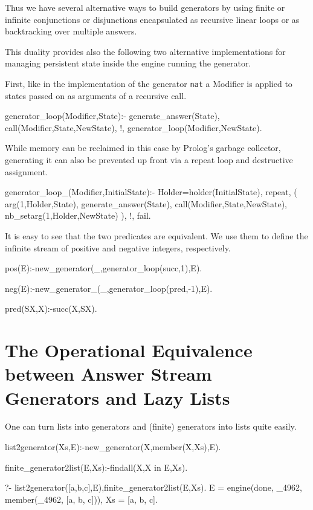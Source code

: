 \documentclass{new_tlp}
\begin{document}
Thus we have several alternative ways to build generators by using finite or infinite conjunctions or disjunctions encapsulated as recursive linear loops or as backtracking over multiple answers.

This duality provides also the following two alternative implementations
for managing persistent state inside the engine running the generator.

First, like in the implementation of the generator {\tt nat} a Modifier
is applied to states passed on as arguments of a recursive call. 
\begin{code}
generator_loop(Modifier,State):-
  generate_answer(State),
  call(Modifier,State,NewState),
  !,
  generator_loop(Modifier,NewState).
\end{code}
While memory can be reclaimed in this case by Prolog's garbage collector,
generating it can also be prevented up front via a repeat loop and destructive assignment.
\begin{code}
generator_loop_(Modifier,InitialState):-
  Holder=holder(InitialState),
  repeat,
    \+ (
      arg(1,Holder,State),
      generate_answer(State),
      call(Modifier,State,NewState),
      nb_setarg(1,Holder,NewState)
    ),
  !,
  fail.
\end{code}

It is easy to see that the two predicates are equivalent. We use
them to define the infinite stream of positive and negative 
integers, respectively.
\begin{code}
pos(E):-new_generator(_,generator_loop(succ,1),E).

neg(E):-new_generator_(_,generator_loop(pred,-1),E).

pred(SX,X):-succ(X,SX).
\end{code}


\section{The Operational Equivalence between Answer Stream Generators and Lazy Lists}

One can turn lists into generators and (finite) generators into lists quite easily.
\begin{code}
list2generator(Xs,E):-new_generator(X,member(X,Xs),E).

finite_generator2list(E,Xs):-findall(X,X in E,Xs).
\end{code}

\BX
\begin{codex}
?- list2generator([a,b,c],E),finite_generator2list(E,Xs).
E = engine(done, _4962, member(_4962, [a, b, c])),
Xs = [a, b, c].
\end{codex}
\EX
\end{document}
